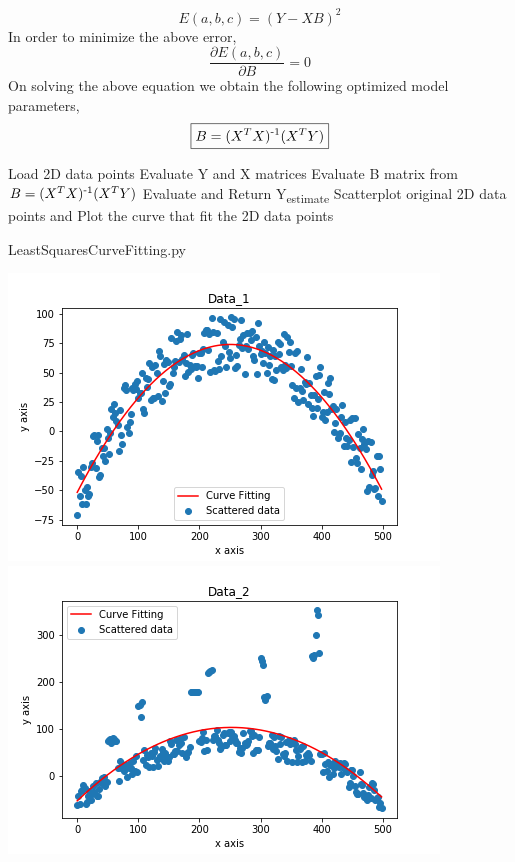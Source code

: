 \documentclass{article}
\begin{document}
\begin{equation}
\boxed{E(a, b, c) = (Y - XB)^2}
\end{equation}
In order to minimize the above error,
\begin{equation}
\boxed{\frac{\partial E(a, b, c)}{\partial B} = 0}
\end{equation}
On solving the above equation we obtain the following optimized model parameters,
\begin{equation}
\boxed{B = (X^TX)\textsuperscript{-1}(X^TY)}
\end{equation}
\begin{algorithm}
\SetAlgoLined
{}
 Load 2D data points\;
 Evaluate Y and X matrices\;
 Evaluate B matrix from $B = (X^TX)\textsuperscript{-1}(X^TY)$\;
 Evaluate and Return Y\textsubscript{estimate}\;
 Scatterplot original 2D data points and Plot the curve that fit the 2D
 data points
\caption{LeastSquaresCurveFitting.py}
\end{algorithm}

\begin{center}
    \includegraphics{least_square_curvefitting_data_1.png}
    \includegraphics{least_square_curvefitting_data_2.png}
\end{center}
\end{document}
